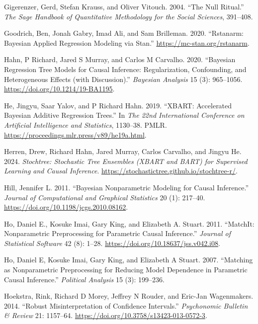 \documentclass[
  letterpaper,
  DIV=11,
  numbers=noendperiod]{scrreprt}
\newlength{\cslhangindent}
\newenvironment{CSLReferences}[2] %
 {\begin{list}{}{%
  \setlength{\itemindent}{0pt}
  \setlength{\leftmargin}{0pt}
  \setlength{\parsep}{0pt}
  \ifodd #1
   \setlength{\leftmargin}{\cslhangindent}
   \setlength{\itemindent}{-1\cslhangindent}
  \fi
  \setlength{\itemsep}{#2\baselineskip}}}
 {\end{list}}
\begin{document}
\begin{CSLReferences}{1}{0}
Gigerenzer, Gerd, Stefan Krauss, and Oliver Vitouch. 2004. {``The Null
Ritual.''} \emph{The Sage Handbook of Quantitative Methodology for the
Social Sciences}, 391--408.

Goodrich, Ben, Jonah Gabry, Imad Ali, and Sam Brilleman. 2020.
{``Rstanarm: {Bayesian} Applied Regression Modeling via {Stan}.''}
\url{https://mc-stan.org/rstanarm}.

Hahn, P Richard, Jared S Murray, and Carlos M Carvalho. 2020.
{``Bayesian Regression Tree Models for Causal Inference: Regularization,
Confounding, and Heterogeneous Effects (with Discussion).''}
\emph{Bayesian Analysis} 15 (3): 965--1056.
\url{https://doi.org/10.1214/19-BA1195}.

He, Jingyu, Saar Yalov, and P Richard Hahn. 2019. {``XBART: Accelerated
Bayesian Additive Regression Trees.''} In \emph{The 22nd International
Conference on Artificial Intelligence and Statistics}, 1130--38. PMLR.
\url{https://proceedings.mlr.press/v89/he19a.html}.

Herren, Drew, Richard Hahn, Jared Murray, Carlos Carvalho, and Jingyu
He. 2024. \emph{Stochtree: Stochastic Tree Ensembles (XBART and BART)
for Supervised Learning and Causal Inference}.
\url{https://stochastictree.github.io/stochtree-r/}.

Hill, Jennifer L. 2011. {``Bayesian Nonparametric Modeling for Causal
Inference.''} \emph{Journal of Computational and Graphical Statistics}
20 (1): 217--40. \url{https://doi.org/10.1198/jcgs.2010.08162}.

Ho, Daniel E., Kosuke Imai, Gary King, and Elizabeth A. Stuart. 2011.
{``{MatchIt}: Nonparametric Preprocessing for Parametric Causal
Inference.''} \emph{Journal of Statistical Software} 42 (8): 1--28.
\url{https://doi.org/10.18637/jss.v042.i08}.

Ho, Daniel E, Kosuke Imai, Gary King, and Elizabeth A Stuart. 2007.
{``Matching as Nonparametric Preprocessing for Reducing Model Dependence
in Parametric Causal Inference.''} \emph{Political Analysis} 15 (3):
199--236.

Hoekstra, Rink, Richard D Morey, Jeffrey N Rouder, and Eric-Jan
Wagenmakers. 2014. {``Robust Misinterpretation of Confidence
Intervals.''} \emph{Psychonomic Bulletin \& Review} 21: 1157--64.
\url{https://doi.org/10.3758/s13423-013-0572-3}.


\end{CSLReferences}
\end{document}
